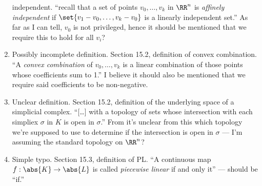 \documentclass{fkletter}
\begin{document}
\begin{enumerate}
    independent. ``recall that a set of points $v_0, \ldots, v_k$ in $\RR^n$ is
    \emph{affinely independent} if $\set{v_1 - v_0, \ldots, v_k - v_0}$ is a
    linearly independent set.'' {\color{red} As far as I can tell, $v_0$ is not
      privileged, hence it should be mentioned that we require this to hold for
      all $v_i$?}
  \item Possibly incomplete definition. Section 15.2, definition of convex
    combination. ``A \emph{convex combination} of $v_0, \ldots, v_k$ is a linear
    combination of those points whose coefficients sum to 1.'' {\color{red} I
      believe it should also be mentioned that we require said coefficients to
      be non-negative.}
  \item Unclear definition. Section 15.2, definition of the underlying space of
    a simplicial complex. ``[\ldots] with a topology of sets whose intersection
    with each simpliex $\sigma$ in $K$ is {\color{red} open in $\sigma$}.'' From
    it's unclear from this which topology we're supposed to use to determine if
    the intersection is open in $\sigma$ --- I'm assuming the standard topology
    on $\RR^n$?
  \item Simple typo. Section 15.3, definition of PL. ``A continuous map $f :
    \abs{K} \to \abs{L}$ is called \emph{piecewise linear} if and only
    {\color{red} it}'' --- should be ``if.''
\end{enumerate}
\end{document}
